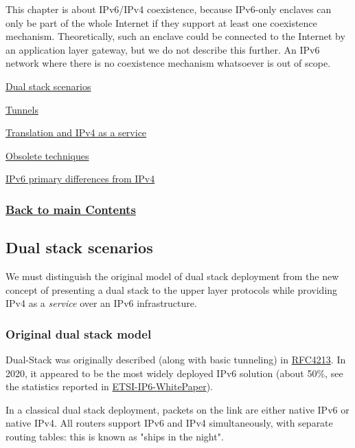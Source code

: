 \documentclass[
]{article}
\begin{document}
This chapter is about IPv6/IPv4 coexistence, because IPv6-only enclaves
can only be part of the whole Internet if they support at least one
coexistence mechanism. Theoretically, such an enclave could be connected
to the Internet by an application layer gateway, but we do not describe
this further. An IPv6 network where there is no coexistence mechanism
whatsoever is out of scope.

\hyperref[dual-stack-scenarios]{Dual stack scenarios}

\hyperref[tunnels]{Tunnels}

\hyperref[translation-and-ipv4-as-a-service]{Translation and IPv4 as a
service}

\hyperref[obsolete-techniques]{Obsolete techniques}

\hyperref[ipv6-primary-differences-from-ipv4]{IPv6 primary differences
from IPv4}

\subsubsection{\texorpdfstring{\hyperref[list-of-contents]{Back to main
Contents}}{Back to main Contents}}\label{back-to-main-contents-2}

\pagebreak

\subsection{Dual stack scenarios}\label{dual-stack-scenarios}

We must distinguish the original model of dual stack deployment from the
new concept of presenting a dual stack to the upper layer protocols
while providing IPv4 as a \emph{service} over an IPv6 infrastructure.

\subsubsection{Original dual stack
model}\label{original-dual-stack-model}

Dual-Stack was originally described (along with basic tunneling) in
\href{https://www.rfc-editor.org/rfc/rfc4213}{RFC4213}. In 2020, it
appeared to be the most widely deployed IPv6 solution (about 50\%, see
the statistics reported in
\href{https://www.etsi.org/images/files/ETSIWhitePapers/etsi_WP35_IPv6_Best_Practices_Benefits_Transition_Challenges_and_the_Way_Forward.pdf}{ETSI-IP6-WhitePaper}).

In a classical dual stack deployment, packets on the link are either
native IPv6 or native IPv4. All routers support IPv6 and IPv4
simultaneously, with separate routing tables: this is known as "ships in
the night".
\end{document}

